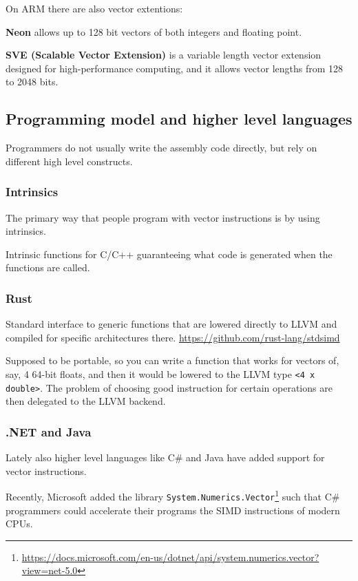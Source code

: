 \documentclass{article}
\begin{document}
On ARM there are also vector extentions:

\textbf{Neon}
allows up to 128 bit vectors of both integers and floating point.

\textbf{SVE (Scalable Vector Extension)}
is a variable length vector extension designed for high-performance computing, and it allows vector lengths from 128 to 2048 bits.

\subsection{Programming model and higher level languages}
Programmers do not usually write the assembly code directly, but rely on different high level constructs.

\subsubsection{Intrinsics}

The primary way that people program with vector instructions is by using intrinsics.

Intrinsic functions for C/C++ guaranteeing what code is generated when the functions are called.

\subsubsection{Rust}

Standard interface to generic functions that are lowered directly to LLVM and compiled for specific architectures there.
\url{https://github.com/rust-lang/stdsimd}

Supposed to be portable, so you can write a function that works for vectors of, say, 4 64-bit floats, and then it would be lowered to the LLVM type \verb!<4 x double>!. The problem of choosing good instruction for certain operations are then delegated to the LLVM backend.

\subsubsection{.NET and Java}

Lately also higher level languages like C\# and Java have added support for vector instructions.

Recently, Microsoft added the library \verb!System.Numerics.Vector!\footnote{\url{https://docs.microsoft.com/en-us/dotnet/api/system.numerics.vector?view=net-5.0}} such that C\# programmers could accelerate their programs the SIMD instructions of modern CPUs.
\end{document}
